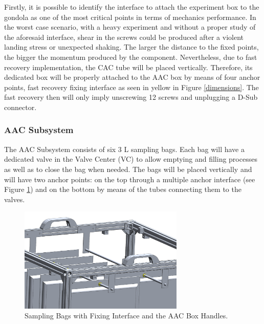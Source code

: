 \smallskip
Firstly, it is possible to identify the interface to attach the experiment box to the gondola as one of the most critical points in terms of mechanics performance. In the worst case scenario, with a heavy experiment and without a proper study of the aforesaid interface, shear in the screws could be produced after a violent landing stress or unexpected shaking. The larger the distance to the fixed points, the bigger the momentum produced by the component. Nevertheless, due to fast recovery implementation, the CAC tube will be placed vertically. Therefore, its dedicated box will be properly attached to the AAC box by means of four anchor points, fast recovery fixing interface as seen in yellow in Figure \ref{dimensions}. The fast recovery then will only imply unscrewing 12 screws and unplugging a D-Sub connector. 


\pagebreak
\subsubsection{AAC Subsystem}\label{sec:aac-analysis}

The AAC Subsystem consists of six 3 L sampling bags. Each bag will have a dedicated valve in the Valve Center (VC) to allow emptying and filling processes as well as to close the bag when needed. The bags will be placed vertically and will have two anchor points: on the top through a  multiple anchor interface (see Figure \ref{anchor_bags}) and on the bottom by means of the tubes connecting them to the valves.


\begin{figure}[H]
    \centering
    \includegraphics[width=0.7\textwidth]{4-experiment-design/img/Mechanical/Bags_Fixing_Interface.png}
    \caption{Sampling Bags with Fixing Interface and the AAC Box Handles.}
    \label{anchor_bags}
\end{figure}

